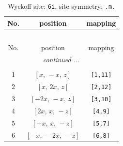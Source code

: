 \documentclass[fleqn,8pt]{jsarticle}
\begin{document}
\renewcommand{\arraystretch}{1.2}
\begin{longtable}{ccc}
\caption{Wyckoff site: {\tt 6i}, site symmetry: {\tt .m.}}
 \\
 \hline \hline
No. & position & mapping \\ \hline \endfirsthead

\multicolumn{2}{l}{\tablename\ \thetable{}} \\
 \hline \hline
No. & position & mapping \\ \hline \endhead

 \hline \hline
\multicolumn{2}{r}{\footnotesize\it continued ...} \\ \endfoot

 \hline \hline
\multicolumn{2}{r}{} \\ \endlastfoot

1 & $\left[ x,\, - x,\, z \right]$ & {\tt [1,11]} \\ \hline
2 & $\left[ x,\, 2 x,\, z \right]$ & {\tt [2,12]} \\ \hline
3 & $\left[ - 2 x,\, - x,\, z \right]$ & {\tt [3,10]} \\ \hline
4 & $\left[ 2 x,\, x,\, - z \right]$ & {\tt [4,9]} \\ \hline
5 & $\left[ - x,\, x,\, - z \right]$ & {\tt [5,7]} \\ \hline
6 & $\left[ - x,\, - 2 x,\, - z \right]$ & {\tt [6,8]} \\
\end{longtable}
\renewcommand{\arraystretch}{1.2}
\end{document}
